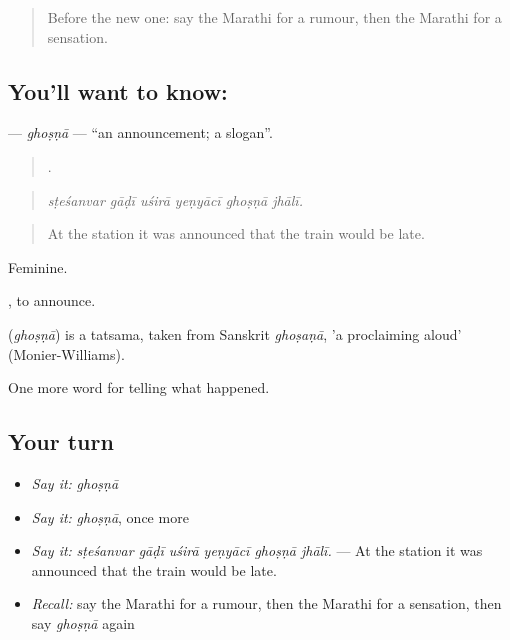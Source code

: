\label{lesson:MR-C313-ghosna}



\begin{quote}
Before the new one: say the Marathi for a rumour, then the Marathi for a sensation.
\end{quote}

\subsection*{You'll want to know: }
\textbf{} — \emph{ghoṣṇā} — \textquotedblleft{}an announcement; a slogan\textquotedblright{}.

\begin{quote}
     .
\end{quote}

\begin{quote}
\emph{sṭeśanvar gāḍī uśirā yeṇyācī ghoṣṇā jhālī.}
\end{quote}

\begin{quote}
At the station it was announced that the train would be late.
\end{quote}

Feminine.

 , to announce.

\begin{cousinweb}
\textbf{} (\emph{ghoṣṇā}) is a tatsama, taken from Sanskrit \emph{ghoṣaṇā}, 'a proclaiming aloud' (Monier-Williams).
\end{cousinweb}

\begin{grammarlens}[title={What you've built}]
One more word for telling what happened.
\end{grammarlens}

\subsection*{Your turn}
\begin{itemize}
\raggedright
  \item \emph{Say it:} \emph{ghoṣṇā}
  \item \emph{Say it:} \emph{ghoṣṇā}, once more
  \item \emph{Say it:} \emph{sṭeśanvar gāḍī uśirā yeṇyācī ghoṣṇā jhālī.} — At the station it was announced that the train would be late.
  \item \emph{Recall:} say the Marathi for a rumour, then the Marathi for a sensation, then say \emph{ghoṣṇā} again
\end{itemize}

